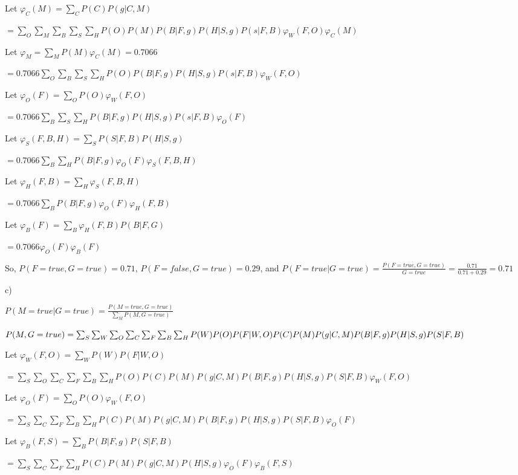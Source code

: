 \documentclass[12pt]{article}
\begin{document}
Let $\varphi_C(M) = \sum_C P(C)P(g \vert C, M)$

$= \sum_O\sum_M\sum_B\sum_S\sum_H P(O)P(M)P(B \vert F, g)P(H \vert S, g)P(s \vert F, B)\varphi_W(F, O)\varphi_C(M)$

Let $\varphi_M = \sum_M P(M)\varphi_C(M) = 0.7066$

$= 0.7066\sum_O\sum_B\sum_S\sum_H P(O)P(B \vert F, g)P(H \vert S, g)P(s \vert F, B)\varphi_W(F, O)$

Let $\varphi_O(F) = \sum_O P(O)\varphi_W(F, O)$

$= 0.7066\sum_B\sum_S\sum_H P(B \vert F, g)P(H \vert S, g)P(s \vert F, B)\varphi_O(F)$

Let $\varphi_S(F, B, H) = \sum_S P(S\vert F, B)P(H \vert S, g)$

$= 0.7066\sum_B\sum_H P(B \vert F, g)\varphi_O(F)\varphi_S(F, B, H)$

Let $\varphi_H(F, B) = \sum_H \varphi_S(F, B, H)$

$= 0.7066\sum_B P(B \vert F, g)\varphi_O(F)\varphi_H(F, B)$

Let $\varphi_B(F) = \sum_B \varphi_H(F, B)P(B \vert F, G)$

$= 0.7066\varphi_O(F)\varphi_B(F)$

So, $P(F = true, G = true) = 0.71$, $P(F = false, G = true) = 0.29$, and $P(F = true \vert G = true) = \frac{P(F = true, G = true)}{G = true} = \frac{0.71}{0.71 + 0.29} = \mathbf{0.71}$

c) 

$P(M = true \vert G = true) = \frac{P(M = true, G = true)}{\sum_M P(M, G = true)}$

$P(M, G = true) = \sum_S\sum_W\sum_O\sum_C\sum_F\sum_B\sum_H P(W)P(O)P(F\vert W, O)P(C)P(M)P(g \vert C, M)\\P(B \vert F, g)P(H \vert S, g)P(S \vert F, B)$

Let $\varphi_W(F, O) = \sum_W P(W)P(F \vert W, O)$

$= \sum_S\sum_O\sum_C\sum_F\sum_B\sum_H P(O)P(C)P(M)P(g \vert C, M)P(B \vert F, g)P(H \vert S, g)P(S \vert F, B)\varphi_W(F, O)$

Let $\varphi_O(F) = \sum_O P(O)\varphi_W(F, O)$

$= \sum_S\sum_C\sum_F\sum_B\sum_H P(C)P(M)P(g \vert C, M)P(B \vert F, g)P(H \vert S, g)P(S \vert F, B)\varphi_O(F)$

Let $\varphi_B(F, S) = \sum_B P(B \vert F, g)P(S \vert F, B)$

$= \sum_S\sum_C\sum_F\sum_H P(C)P(M)P(g \vert C, M)P(H \vert S, g)\varphi_O(F)\varphi_B(F, S)$
\end{document}
